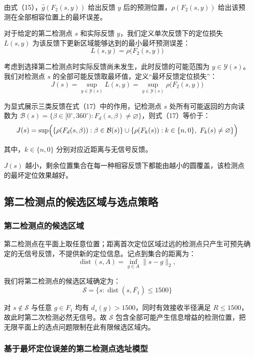 由式（15），\(\hat g(F_2(s,y))\) 给出反馈 \(y\) 后的预测位置，\(\rho(F_2(s,y))\) 给出该预测在全部相容位置上的最坏误差。

对于给定的第二检测点 \(s\) 和实际反馈 \(y\)，我们定义单次反馈下的定位损失 \(L(s,y)\) 为该反馈下更新区域能够达到的最小最坏预测误差：
\[
L(s,y)=\rho\bigl(F_2(s,y)\bigr)
\tag{16}
\]

考虑到选择第二检测点时实际反馈尚未发生，此时反馈的可能范围为 \(y\in\mathcal Y(s)\)。我们对检测点 \(s\) 的全部可能反馈取最坏值，定义``最坏反馈定位损失''：
\[
J(s)=\sup_{y\in\mathcal Y(s)}L(s,y)
=\sup_{y\in\mathcal Y(s)}\rho\bigl(F_2(s,y)\bigr)
\tag{17}
\]

为显式展示三类反馈在式（17）中的作用，记检测点 \(s\) 处所有可能返回的方向读数为 \(\mathcal B(s)=\{\beta\in[0^\circ,360^\circ):F_d(s,\beta)\ne\varnothing\}\)，则式（17）等价于：
\[
J(s)=\sup\Bigl(\{\rho(F_d(s,\beta)):\beta\in\mathcal B(s)\}\cup\{\rho(F_k(s)):k\in\{n,0\},\ F_k(s)\ne\varnothing\}\Bigr)
\]

其中，\(k\in\{n,0\}\) 分别对应近距离与无信号反馈。

\(J(s)\) 越小，剩余位置集合在每一种相容反馈下都能由越小的圆覆盖，该检测点的最坏定位效果越好。

\subsection{第二检测点的候选区域与选点策略}

\subsubsection{第二检测点的候选区域}

第二检测点在平面上取任意位置；距离首次定位区域过远的检测点只产生可预先确定的无信号反馈，不提供新的定位信息。记点到集合的距离为：
\[
\operatorname{dist}(s,A)=\inf_{g\in A}\|s-g\|_2,
\]

我们将第二检测点的候选区域确定为：
\[
\mathcal S=
\{s:\operatorname{dist}(s,\overline{F_1})\le1500\}
\tag{18}
\]

对 \(s\notin\mathcal S\) 与任意 \(g\in F_1\) 均有 \(d_s(g)>1500\)，同时有效接收半径满足 \(R\le1500\)，故此时第二次检测必然无信号。故 \(\mathcal S\) 包含全部可能产生信息增益的检测位置，把无限平面上的选点问题限制在此有限候选区域内。

\subsubsection{基于最坏定位误差的第二检测点选址模型}

